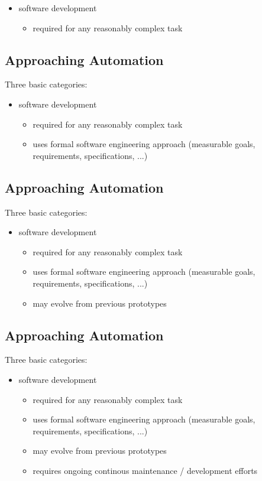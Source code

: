 \documentclass[xga]{xdvislides}
\begin{document}
\begin{itemize}
	\item software development
		\begin{itemize}
			\item required for any reasonably complex task
		\end{itemize}
\end{itemize}

\subsection{Approaching Automation}
Three basic categories:
\\

\begin{itemize}
	\item software development
		\begin{itemize}
			\item required for any reasonably complex task
			\item uses formal software engineering approach (measurable goals,
				requirements, specifications, ...)
		\end{itemize}
\end{itemize}

\subsection{Approaching Automation}
Three basic categories:
\\

\begin{itemize}
	\item software development
		\begin{itemize}
			\item required for any reasonably complex task
			\item uses formal software engineering approach (measurable goals,
				requirements, specifications, ...)
			\item may evolve from previous prototypes
		\end{itemize}
\end{itemize}


\subsection{Approaching Automation}
Three basic categories:
\\

\begin{itemize}
	\item software development
		\begin{itemize}
			\item required for any reasonably complex task
			\item uses formal software engineering approach (measurable goals,
				requirements, specifications, ...)
			\item may evolve from previous prototypes
			\item requires ongoing continous maintenance / development efforts
		\end{itemize}
\end{itemize}
\end{document}
